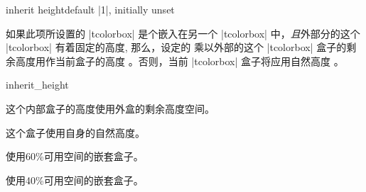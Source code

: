 \begin{docTcbKey}[][doc new={2017-06-28}]{inherit height}{}{default |1|, initially unset}

如果此项所设置的 |tcolorbox| 是个嵌入在另一个%
 |tcolorbox| 中，\emph{且}外部分的这个 |tcolorbox| 有着固定的高度, 那么，设定的  乘以外部的这个 |tcolorbox| 盒子的剩余高度用作当前盒子的高度 。否则，当前 |tcolorbox| 盒子将应用自然高度  。

\begin{exdispExample}{inherit_height}

\begin{tcolorbox}[title=外部盒子指定高度为4cm,height=4cm]
  \begin{tcolorbox}[title=Inner box,nobeforeafter,inherit height]
    这个内部盒子的高度使用外盒的剩余高度空间。
  \end{tcolorbox}
\end{tcolorbox}

\begin{tcolorbox}[title=外部盒子使用自然高度]
  \begin{tcolorbox}[title=Inner box,nobeforeafter,inherit height]
    这个盒子使用自身的自然高度。
  \end{tcolorbox}
\end{tcolorbox}

\begin{tcolorbox}[title=外部盒子指定高度为5cm,height=5cm]
  \begin{tcolorbox}[title=内部盒子,nobeforeafter,inherit height]
    \begin{tcolorbox}[colframe=red,beforeafter skip=0pt,inherit height=0.6]
      使用60\%可用空间的嵌套盒子。
    \end{tcolorbox}
    \begin{tcolorbox}[colframe=red,beforeafter skip=0pt,inherit height=0.4]
      使用40\%可用空间的嵌套盒子。
    \end{tcolorbox}
  \end{tcolorbox}
\end{tcolorbox}
\end{exdispExample}
\end{docTcbKey}
 




